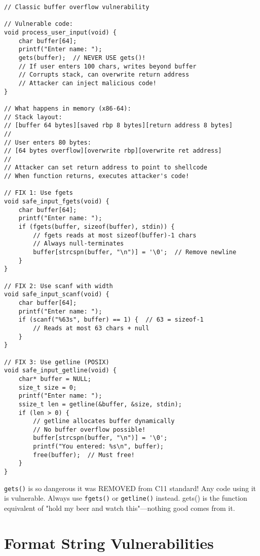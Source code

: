 \begin{lstlisting}
// Classic buffer overflow vulnerability

// Vulnerable code:
void process_user_input(void) {
    char buffer[64];
    printf("Enter name: ");
    gets(buffer);  // NEVER USE gets()!
    // If user enters 100 chars, writes beyond buffer
    // Corrupts stack, can overwrite return address
    // Attacker can inject malicious code!
}

// What happens in memory (x86-64):
// Stack layout:
// [buffer 64 bytes][saved rbp 8 bytes][return address 8 bytes]
//
// User enters 80 bytes:
// [64 bytes overflow][overwrite rbp][overwrite ret address]
//
// Attacker can set return address to point to shellcode
// When function returns, executes attacker's code!

// FIX 1: Use fgets
void safe_input_fgets(void) {
    char buffer[64];
    printf("Enter name: ");
    if (fgets(buffer, sizeof(buffer), stdin)) {
        // fgets reads at most sizeof(buffer)-1 chars
        // Always null-terminates
        buffer[strcspn(buffer, "\n")] = '\0';  // Remove newline
    }
}

// FIX 2: Use scanf with width
void safe_input_scanf(void) {
    char buffer[64];
    printf("Enter name: ");
    if (scanf("%63s", buffer) == 1) {  // 63 = sizeof-1
        // Reads at most 63 chars + null
    }
}

// FIX 3: Use getline (POSIX)
void safe_input_getline(void) {
    char* buffer = NULL;
    size_t size = 0;
    printf("Enter name: ");
    ssize_t len = getline(&buffer, &size, stdin);
    if (len > 0) {
        // getline allocates buffer dynamically
        // No buffer overflow possible!
        buffer[strcspn(buffer, "\n")] = '\0';
        printf("You entered: %s\n", buffer);
        free(buffer);  // Must free!
    }
}
\end{lstlisting}

\begin{warningbox}
\texttt{gets()} is so dangerous it was REMOVED from C11 standard! Any code using it is vulnerable. Always use \texttt{fgets()} or \texttt{getline()} instead. gets() is the function equivalent of "hold my beer and watch this"---nothing good comes from it.
\end{warningbox}

\section{Format String Vulnerabilities}

